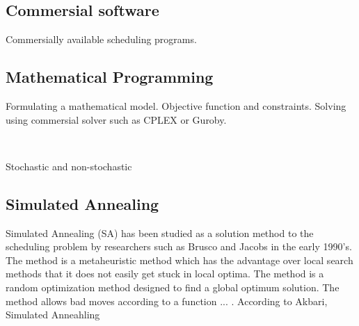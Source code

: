 
\subsection{Commersial software}

Commersially available scheduling programs.

\subsection{Mathematical Programming}

Formulating a mathematical model. Objective function and constraints. Solving using commersial solver such as CPLEX or Guroby.




\ %


Stochastic and non-stochastic

\subsection{Simulated Annealing}

Simulated Annealing (SA) has been studied as a solution method to the scheduling problem by researchers such as Brusco and Jacobs in the early 1990's. The method is a metaheuristic method which has the advantage over local search methods that it does not easily get stuck in local optima. The method is a random optimization method designed to find a global optimum solution. The method allows bad moves according to a function ... . 
According to Akbari, Simulated Anneahling 

